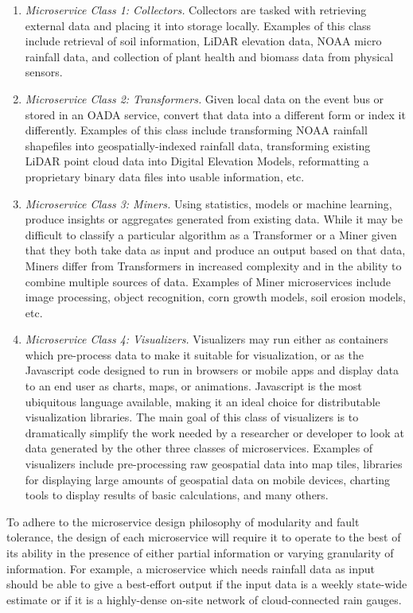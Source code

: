 \documentclass[11pt]{article}
\begin{document}
\begin{enumerate}
\item {\em Microservice Class 1: Collectors.} Collectors are tasked with retrieving external data and placing it into 
	storage locally.  Examples of this class include retrieval of soil information, LiDAR elevation data, 
	NOAA micro rainfall data, and collection of plant health and biomass data from physical sensors.
\item {\em Microservice Class 2: Transformers.} Given local data on the event bus or stored in an 
	OADA service, convert that data into a different form or index it differently.  Examples of this class 
	include transforming NOAA rainfall shapefiles into geospatially-indexed rainfall data, transforming 
	existing LiDAR point cloud data into Digital Elevation Models, reformatting a proprietary binary 
	data files into usable information, etc.
\item {\em Microservice Class 3: Miners.} Using statistics, models or machine learning, produce insights or 
	aggregates generated from existing data.  While it may be difficult to classify a particular algorithm as a 
	Transformer or a Miner given that they both take data as input and produce an output based on that data, 
	Miners differ from Transformers in increased complexity and in the ability to combine multiple sources of data.  
	Examples of Miner microservices include image processing, object recognition, corn growth models, soil 
	erosion models, etc.
\item {\em Microservice Class 4: Visualizers.} Visualizers may run either as containers which pre-process data to 
	make it suitable for visualization, or as the Javascript code designed to run in browsers or mobile apps and 
	display data to an end user as charts, maps, or animations.  Javascript is the most ubiquitous language available, 
	making it an ideal choice for distributable visualization libraries.  The main goal of this class of visualizers is to 
	dramatically simplify the work needed by a researcher or developer to look at data generated by the other 
	three classes of microservices.  Examples of visualizers include pre-processing raw geospatial data into 
	map tiles, libraries for displaying large amounts of geospatial data on mobile devices, charting tools to 
	display results of basic calculations, and many others.
\end{enumerate}

To adhere to the microservice design philosophy of modularity and fault tolerance, the design of each microservice 
will require it to operate to the best of its ability in the presence of either partial information or varying granularity 
of information.  For example, a microservice which needs rainfall data as input should be able to give a best-effort 
output if the input data is a weekly state-wide estimate or if it is a highly-dense on-site network of cloud-connected rain 
gauges.  
\end{document}
